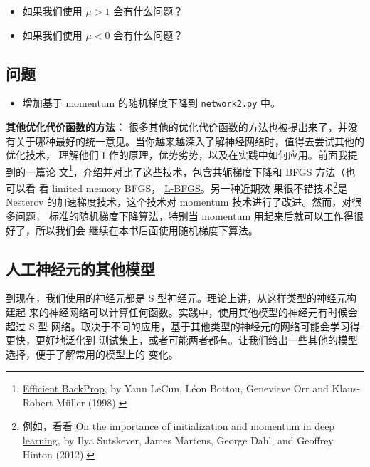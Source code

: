 \begin{itemize}
\item 如果我们使用 $\mu > 1$ 会有什么问题？
\item 如果我们使用 $\mu < 0$ 会有什么问题？
\end{itemize}

\subsection*{问题}

\begin{itemize}
\item 增加基于 momentum 的随机梯度下降到 \lstinline!network2.py! 中。
\end{itemize}

\textbf{其他优化代价函数的方法：} 很多其他的优化代价函数的方法也被提出来了，并没
有关于哪种最好的统一意见。当你越来越深入了解神经网络时，值得去尝试其他的优化技术，
理解他们工作的原理，优势劣势，以及在实践中如何应用。前面我提到的一篇论
文\footnote{\href{http://yann.lecun.com/exdb/publis/pdf/lecun-98b.pdf}{Efficient
    BackProp}, by Yann LeCun, Léon Bottou, Genevieve Orr and Klaus-Robert
  Müller (1998).}，介绍并对比了这些技术，包含共轭梯度下降和 BFGS 方法（也可以看
  看 limited memory BFGS，
  \href{http://en.wikipedia.org/wiki/Limited-memory_BFGS}{L-BFGS}。另一种近期效
  果很不错技术\footnote{例如，看看
    \href{http://www.cs.toronto.edu/~hinton/absps/momentum.pdf}{On the
      importance of initialization and momentum in deep learning}, by Ilya
    Sutskever, James Martens, George Dahl, and Geoffrey Hinton (2012).}是
  Nesterov 的加速梯度技术，这个技术对 momentum 技术进行了改进。然而，对很多问题，
  标准的随机梯度下降算法，特别当 momentum 用起来后就可以工作得很好了，所以我们会
  继续在本书后面使用随机梯度下算法。

\subsection{人工神经元的其他模型}
\label{subsec:other_models_of_artificial_neuron}

到现在，我们使用的神经元都是 S 型神经元。理论上讲，从这样类型的神经元构建起
来的神经网络可以计算任何函数。实践中，使用其他模型的神经元有时候会超过 S 型
网络。取决于不同的应用，基于其他类型的神经元的网络可能会学习得更快，更好地泛化到
测试集上，或者可能两者都有。让我们给出一些其他的模型选择，便于了解常用的模型上的
变化。

